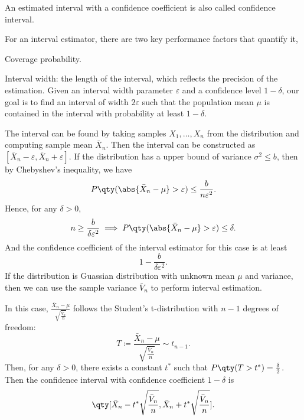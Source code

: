\documentclass[a4paper,12pt]{report}
\begin{document}
An estimated interval with a confidence coefficient is also called confidence interval.

For an interval estimator, there are two key performance factors that quantify it,
\bit
\item Coverage probability.
\item Interval width: the length of the interval, which reflects the precision of the estimation.
\eit
{}
Given an interval width parameter $\varepsilon$ and a confidence level $1-\delta$, our goal is to find an interval of width $2\varepsilon$ such that the population mean $\mu$ is contained in the interval with probability at least $1-\delta$.

The interval can be found by taking samples $X_1,\ldots,X_n$ from the distribution and computing sample mean $\bar{X}_n$. Then the interval can be constructed as $[\bar{X}_n-\varepsilon,\bar{X}_n+\varepsilon]$.
If the distribution has a upper bound of variance $\sigma^2\le b$, then by Chebyshev's inequality, we have
\[P\qty(\abs{\bar{X}_n-\mu}>\varepsilon)\le\frac{b}{n\varepsilon^2}.\]
Hence, for any $\delta>0$,
\[n\ge\frac{b}{\delta\varepsilon^2}\implies P\qty(\abs{\bar{X}_n-\mu}>\varepsilon)\le\delta.\]
And the confidence coefficient of the interval estimator for this case is at least
\[1-\frac{b}{\delta\varepsilon^2}.\]
If the distribution is Guassian distribution with unknown mean $\mu$ and variance, then we can use the sample variance $\bar{V}_n$ to perform interval estimation.

In this case, $\frac{\bar{X}_n-\mu}{\sqrt{\frac{\bar{V}_n}{n}}}$ follows the Student's t-distribution with $n-1$ degrees of freedom:
\[T\coloneq\frac{\bar{X}_n-\mu}{\sqrt{\frac{\bar{V}_n}{n}}}\sim t_{n-1}.\]
Then, for any $\delta>0$, there exists a constant $t^*$ such that $P\qty(T>t^*)=\frac{\delta}{2}$. Then the confidence interval with confidence coefficient $1-\delta$ is
\[\qty[\bar{X}_n-t^*\sqrt{\frac{\bar{V}_n}{n}},\bar{X}_n+t^*\sqrt{\frac{\bar{V}_n}{n}}].\]
\end{document}
